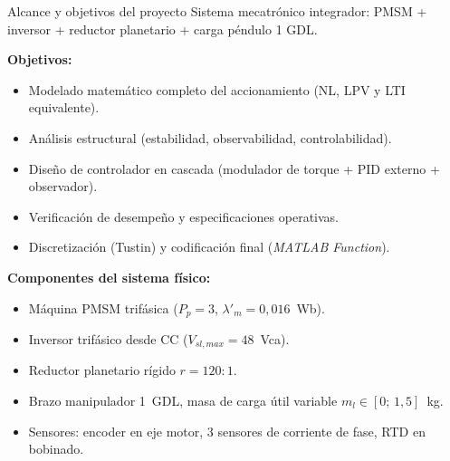 \documentclass[aspectratio=169,t]{beamer}
\begin{document}
\begin{frame}{Alcance y objetivos del proyecto}
  {\small\color{uncGray}Sistema mecatrónico integrador: PMSM + inversor + reductor planetario + carga péndulo 1 GDL.}\par
  \vspace{4mm}

  \textbf{Objetivos:}
  \begin{itemize}
    \item Modelado matemático completo del accionamiento (NL, LPV y LTI equivalente).
    \item Análisis estructural (estabilidad, observabilidad, controlabilidad).
    \item Diseño de controlador en cascada (modulador de torque + PID externo + observador).
    \item Verificación de desempeño y especificaciones operativas.
    \item Discretización (Tustin) y codificación final (\textit{MATLAB Function}).
  \end{itemize}

  \vspace{3mm}
  \textbf{Componentes del sistema físico:}
  \begin{itemize}
    \item Máquina PMSM trifásica ($P_p=3$, $\lambda'_m=0{,}016$~Wb).
    \item Inversor trifásico desde CC ($V_{sl,max}=48$~Vca).
    \item Reductor planetario rígido $r=120{:}1$.
    \item Brazo manipulador 1~GDL, masa de carga útil variable $m_l\in[0;\,1{,}5]$~kg.
    \item Sensores: encoder en eje motor, 3 sensores de corriente de fase, RTD en bobinado.
  \end{itemize}
\end{frame}
\end{document}
